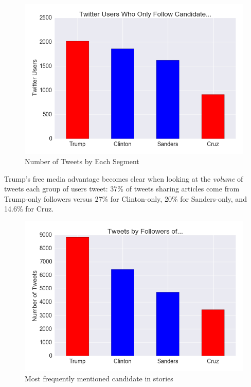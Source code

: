 \documentclass[letterpaper]{article}
\begin{document}
\begin{figure}[t!]  
\centering 
  \includegraphics[width=\columnwidth]{users-by-candid}  
  \caption{Number of Tweets by Each Segment
    \label{fig:users-by-candid}}
\end{figure} 

 

Trump's free media advantage becomes clear when looking at the \emph{volume} of tweets each group of users tweet: 37\% of tweets sharing articles come from Trump-only followers versus 27\% for Clinton-only, 20\% for Sanders-only, and 14.6\% for Cruz.

\begin{figure}[t!]  
\centering 
  \includegraphics[width=\columnwidth]{tweets-by-candid}  
  \caption{Most frequently mentioned candidate in stories
    \label{fig:tweets-by-candid}}
\end{figure} 
\end{document}
